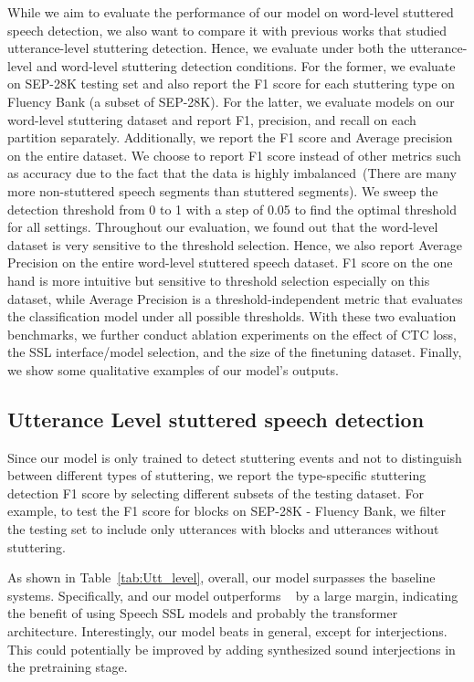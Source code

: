 
While we aim to evaluate the performance of our model on word-level stuttered speech detection,  we also want to compare it with previous works that studied utterance-level stuttering detection.
Hence, we evaluate under both the utterance-level and word-level stuttering detection conditions.
For the former, we evaluate on SEP-28K testing set and also report the F1 score for each stuttering type on Fluency Bank (a subset of SEP-28K).
For the latter, we evaluate models on our word-level stuttering dataset and report F1, precision, and recall on each partition separately.
Additionally, we report the F1 score and Average precision on the entire dataset.
We choose to report F1 score instead of other metrics such as accuracy due to the fact that the data is highly imbalanced~(There are many more non-stuttered speech segments than stuttered segments).
We sweep the detection threshold from 0 to 1 with a step of 0.05 to find the optimal threshold for all settings.
Throughout our evaluation, we found out that the word-level dataset is very sensitive to the threshold selection.
Hence, we also report Average Precision on the entire word-level stuttered speech dataset.
F1 score on the one hand is more intuitive but sensitive to threshold selection especially on this dataset, while Average Precision is a threshold-independent metric that evaluates the classification model under all possible thresholds.
With these two evaluation benchmarks, we further conduct ablation experiments on the effect of CTC loss, the SSL interface/model selection, and the size of the finetuning dataset.
Finally, we show some qualitative examples of our model's outputs.

\vspace{-10pt}
\subsection{Utterance Level stuttered speech detection}
Since our model is only trained to detect stuttering events and not to distinguish between different types of stuttering, we report the type-specific stuttering detection F1 score by selecting different subsets of the testing dataset.
For example, to test the F1 score for blocks on SEP-28K - Fluency Bank, we filter the testing set to include only utterances with blocks and utterances without stuttering.

As shown in Table~\ref{tab:Utt_level}, overall, our model surpasses the baseline systems.
Specifically, \cite{bayerl22b_interspeech,bayerl23_interspeech} and our model outperforms ~\cite{harvill22_interspeech} by a large margin, indicating the benefit of using Speech SSL models and probably the transformer architecture.
Interestingly, our model beats \cite{bayerl22b_interspeech,bayerl23_interspeech} in general, except for interjections.
This could potentially be improved by adding synthesized sound interjections in the pretraining stage.

